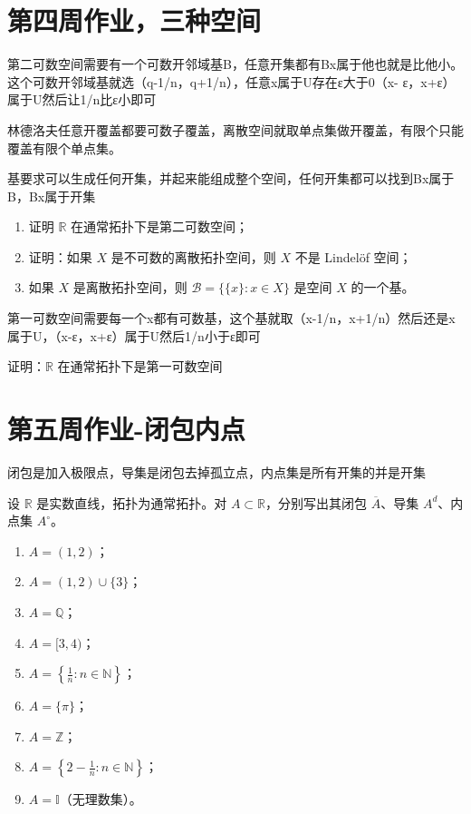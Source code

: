\section*{第四周作业，三种空间}
\begin{dxtips}
    第二可数空间需要有一个可数开邻域基B，任意开集都有Bx属于他也就是比他小。这个可数开邻域基就选（q-1/n，q+1/n），任意x属于U存在ε大于0（x- ε，x+ε）属于U然后让1/n比ε小即可
\end{dxtips}
\begin{dxtips}
    林德洛夫任意开覆盖都要可数子覆盖，离散空间就取单点集做开覆盖，有限个只能覆盖有限个单点集。
\end{dxtips}
\begin{dxtips}
    基要求可以生成任何开集，并起来能组成整个空间，任何开集都可以找到Bx属于B，Bx属于开集
\end{dxtips}
\begin{homework}
[4]
\begin{enumerate}
  \item 证明 $\mathbb{R}$ 在通常拓扑下是第二可数空间；
  \item 证明：如果 $X$ 是不可数的离散拓扑空间，则 $X$ 不是 Lindelöf 空间；
  \item 如果 $X$ 是离散拓扑空间，则 $\mathcal{B} = \{\{x\}: x \in X\}$ 是空间 $X$ 的一个基。
\end{enumerate}
\end{homework}
\begin{dxtips}
    第一可数空间需要每一个x都有可数基，这个基就取（x-1/n，x+1/n）然后还是x属于U，（x-ε，x+ε）属于U然后1/n小于ε即可
\end{dxtips}
\begin{homework}
[5] 
证明：$\mathbb{R}$ 在通常拓扑下是第一可数空间
\end{homework}


\section{第五周作业-闭包内点}
\begin{dxtips}
    闭包是加入极限点，导集是闭包去掉孤立点，内点集是所有开集的并是开集
\end{dxtips}
\begin{homework}[6]
设 $\mathbb{R}$ 是实数直线，拓扑为通常拓扑。对 $A \subset \mathbb{R}$，分别写出其闭包 $\overline{A}$、导集 $A^d$、内点集 $A^\circ$。

\begin{enumerate}[(1)]
  \item $A = (1,2)$；
  \item $A = (1,2)\cup\{3\}$；
  \item $A = \mathbb{Q}$；
  \item $A = [3,4)$；
  \item $A = \left\{\tfrac{1}{n} : n\in\mathbb{N}\right\}$；
  \item $A = \{\pi\}$；
  \item $A = \mathbb{Z}$；
  \item $A = \left\{2 - \tfrac{1}{n} : n\in\mathbb{N}\right\}$；
  \item $A = \mathbb{I}$（无理数集）。
\end{enumerate}
\end{homework}

